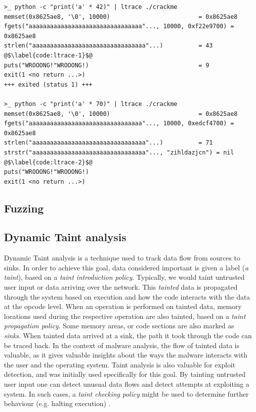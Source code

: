 
\begin{lstlisting}[caption={TODO}, label={code:ltrace}]
>_ python -c "print('a' * 42)" | ltrace ./crackme
memset(0x8625ae8, '\0', 10000)                         = 0x8625ae8
fgets("aaaaaaaaaaaaaaaaaaaaaaaaaaaaaaaa"..., 10000, 0xf22e9700) = 0x8625ae8
strlen("aaaaaaaaaaaaaaaaaaaaaaaaaaaaaaaa"...)          = 43 @$\label{code:ltrace-1}$@
puts("WROOONG!"WROOONG!)                               = 9
exit(1 <no return ...>)
+++ exited (status 1) +++

>_ python -c "print('a' * 70)" | ltrace ./crackme
memset(0x8625ae8, '\0', 10000)                         = 0x8625ae8
fgets("aaaaaaaaaaaaaaaaaaaaaaaaaaaaaaaa"..., 10000, 0xedcf4700) = 0x8625ae8
strlen("aaaaaaaaaaaaaaaaaaaaaaaaaaaaaaaa"...)          = 71
strstr("aaaaaaaaaaaaaaaaaaaaaaaaaaaaaaaa"..., "zihldazjcn") = nil @$\label{code:ltrace-2}$@
puts("WROOONG!"WROOONG!)
exit(1 <no return ...>)
\end{lstlisting}

\subsection{Fuzzing}

\subsection{Dynamic Taint analysis}

Dynamic Taint analysis is a technique used to track data flow from sources to sinks. In order to achieve this goal, data considered important is given a label (\emph{a taint}), based on a \emph{taint introduction policy}. Typically, we would taint untrusted user input or data arriving over the network. This \emph{tainted} data is propagated through the system based on execution and how the code interacts with the data at the opcode level. When an operation is performed on tainted data, memory locations used during the respective operation are also tainted, based on a \emph{taint propagation policy}. Some memory areas, or code sections are also marked as \emph{sinks}. When tainted data arrived at a sink, the path it took through the code can be traced back. In the context of malware analysis, the flow of tainted data is valuable, as it gives valuable insights about the ways the malware interacts with the user and the operating system. Taint analysis is also valuable for exploit detection, and was initially used specifically for this goal. By tainting untrusted user input one can detect unusual data flows and detect attempts at exploiting a system. In such cases, a \emph{taint checking policy} might be used to determine further behaviour (e.g. halting execution) \cite{da_survey_2019} \cite{all_about_taint_2010}.

